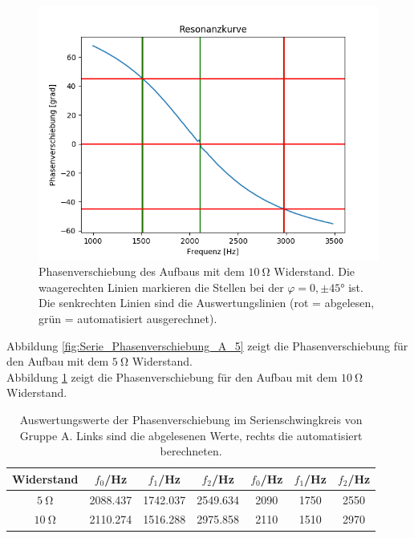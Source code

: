 \documentclass[12pt,a4paper]{article}
\begin{document}
\begin{figure}
\centering
\includegraphics[scale=0.8]{Bilder/Serie_Phasenverschiebung_A_10.png}
\caption{Phasenverschiebung des Aufbaus mit dem $\SI{10}{\ohm}$ Widerstand. Die waagerechten Linien markieren die Stellen bei der $\varphi = 0, \pm \ang{45}$ ist. Die senkrechten Linien sind die Auswertungslinien (rot = abgelesen, grün = automatisiert ausgerechnet).}
\label{fig:Serie_Phasenverschiebung_A_10}
\end{figure}
Abbildung \ref{fig:Serie_Phasenverschiebung_A_5} zeigt die Phasenverschiebung für den Aufbau mit dem $\SI{5}{\ohm}$ Widerstand. \\
Abbildung \ref{fig:Serie_Phasenverschiebung_A_10} zeigt die Phasenverschiebung für den Aufbau mit dem $\SI{10}{\ohm}$ Widerstand.

\begin{table}
\centering
\begin{tabular}{|c|c|c|c||c|c|c|}
\hline
Widerstand & $f_0$/Hz & $f_1$/Hz & $f_2$/Hz & $f_0$/Hz & $f_1$/Hz & $f_2$/Hz \\
\hline
$\SI{5}{\ohm}$ & 2088.437 & 1742.037 & 2549.634 & 2090 & 1750 & 2550 \\
\hline
$\SI{10}{\ohm}$ & 2110.274 & 1516.288 & 2975.858 & 2110 & 1510 & 2970 \\
\hline
\end{tabular}
\caption{Auswertungswerte der Phasenverschiebung im Serienschwingkreis von Gruppe A. Links sind die abgelesenen Werte, rechts die automatisiert berechneten.}
\label{tab:StromPhasenverschiebung_A}
\end{table}
\end{document}
